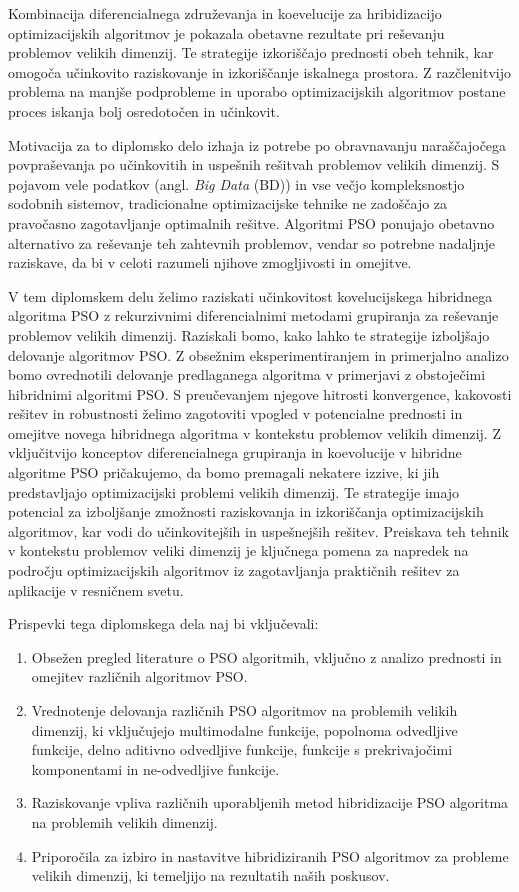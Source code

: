 Kombinacija diferencialnega združevanja in koevelucije za hribidizacijo optimizacijskih algoritmov je pokazala obetavne rezultate pri reševanju problemov velikih dimenzij.
Te strategije izkoriščajo prednosti obeh tehnik, kar omogoča učinkovito raziskovanje in izkoriščanje iskalnega prostora.
Z razčlenitvijo problema na manjše podprobleme in uporabo optimizacijskih algoritmov postane proces iskanja bolj osredotočen in učinkovit.

Motivacija za to diplomsko delo izhaja iz potrebe po obravnavanju naraščajočega povpraševanja po učinkovitih in uspešnih rešitvah problemov velikih dimenzij.
S pojavom vele podatkov (angl. \textit{Big Data} (BD)) in vse večjo kompleksnostjo sodobnih sistemov, tradicionalne optimizacijske tehnike ne zadoščajo za pravočasno zagotavljanje optimalnih rešitve.
Algoritmi PSO ponujajo obetavno alternativo za reševanje teh zahtevnih problemov, vendar so potrebne nadaljnje raziskave, da bi v celoti razumeli njihove zmogljivosti in omejitve.

V tem diplomskem delu želimo raziskati učinkovitost kovelucijskega hibridnega algoritma PSO z rekurzivnimi diferencialnimi metodami grupiranja za reševanje problemov velikih dimenzij.
Raziskali bomo, kako lahko te strategije izboljšajo delovanje algoritmov PSO.
Z obsežnim eksperimentiranjem in primerjalno analizo bomo ovrednotili delovanje predlaganega algoritma v primerjavi z obstoječimi hibridnimi algoritmi PSO.
S preučevanjem njegove hitrosti konvergence, kakovosti rešitev in robustnosti želimo zagotoviti vpogled v potencialne prednosti in omejitve novega hibridnega algoritma v kontekstu problemov velikih dimenzij.
Z vključitvijo konceptov diferencialnega grupiranja in koevolucije v hibridne algoritme PSO pričakujemo, da bomo premagali nekatere izzive, ki jih predstavljajo optimizacijski problemi velikih dimenzij.
Te strategije imajo potencial za izboljšanje zmožnosti raziskovanja in izkoriščanja optimizacijskih algoritmov,  kar vodi do učinkovitejših in uspešnejših rešitev.
Preiskava teh tehnik v kontekstu problemov veliki dimenzij je ključnega pomena za napredek na področju optimizacijskih algoritmov iz zagotavljanja praktičnih rešitev za aplikacije v resničnem svetu.

Prispevki tega diplomskega dela naj bi vključevali:
\begin{enumerate}
    \item Obsežen pregled literature o PSO algoritmih, vključno z analizo prednosti in omejitev različnih algoritmov PSO.
    \item Vrednotenje delovanja različnih PSO algoritmov na problemih velikih dimenzij, ki vključujejo multimodalne funkcije, popolnoma odvedljive funkcije, delno aditivno odvedljive funkcije, funkcije s prekrivajočimi komponentami in ne-odvedljive funkcije.
    \item Raziskovanje vpliva različnih uporabljenih metod hibridizacije PSO algoritma na problemih velikih dimenzij.
    \item Priporočila za izbiro in nastavitve hibridiziranih PSO algoritmov za probleme velikih dimenzij, ki temeljijo na rezultatih naših poskusov.
\end{enumerate}

